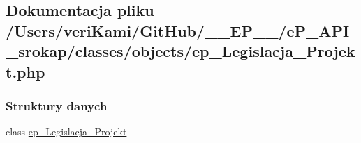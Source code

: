 \hypertarget{ep___legislacja___projekt_8php}{\subsection{Dokumentacja pliku /\-Users/veri\-Kami/\-Git\-Hub/\-\_\-\-\_\-\-E\-P\-\_\-\-\_\-/e\-P\-\_\-\-A\-P\-I\-\_\-srokap/classes/objects/ep\-\_\-\-Legislacja\-\_\-\-Projekt.php}
\label{ep___legislacja___projekt_8php}
}
\subsubsection*{Struktury danych}
\begin{DoxyCompactItemize}
\item 
class \hyperlink{classep___legislacja___projekt}{ep\-\_\-\-Legislacja\-\_\-\-Projekt}
\end{DoxyCompactItemize}
